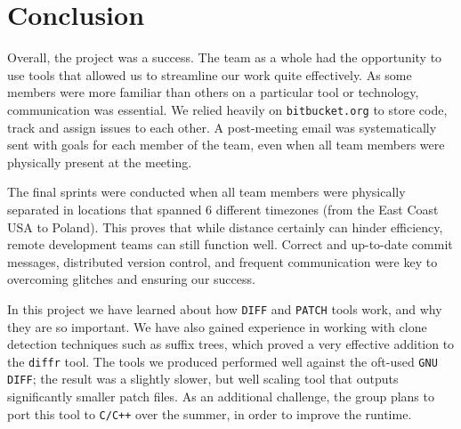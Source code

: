 \section{Conclusion}

Overall, the project was a success. The team as a whole had the opportunity to use tools that allowed us to streamline our work quite effectively. As some members were more familiar than others on a particular tool or technology, communication was essential. We relied heavily on \texttt{bitbucket.org} to store code, track and assign issues to each other. A post-meeting email was systematically sent with goals for each member of the team, even when all team members were physically present at the meeting.

The final sprints were conducted when all team members were physically separated in locations that spanned 6 different timezones (from the East Coast USA to Poland). This proves that while distance certainly can hinder efficiency, remote development teams can still function well. Correct and up-to-date commit messages, distributed version control, and frequent communication were key to overcoming glitches and ensuring our success.

In this project we have learned about how \texttt{DIFF} and \texttt{PATCH} tools work, and why they are so important. We have also gained experience in working with clone detection techniques such as suffix trees, which proved a very effective addition to the \texttt{diffr} tool. The tools we produced performed well against the oft-used \texttt{GNU DIFF}; the result was a slightly slower, but well scaling tool that outputs significantly smaller patch files. As an additional challenge, the group plans to port this tool to \texttt{C/C++} over the summer, in order to improve the runtime.
